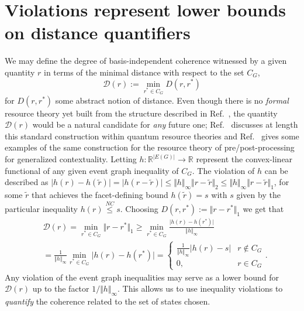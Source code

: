 \documentclass[a4paper,twocolumn,11pt,accepted=2024-01-17]{quantumarticle}
\begin{document}
\onecolumn
\appendix

\section{Violations represent lower bounds on distance quantifiers}\label{appendix: rigorous violations analysis}



We may define the degree of basis-independent coherence witnessed by a given quantity $r$ in terms of the minimal distance with respect to the set $C_G$,
\begin{equation}
    \mathcal{D}(r) := \min_{r^* \in C_G} D(r,r^*)
\end{equation}
for $D(r,r^*)$ some abstract notion of distance. Even though there is no \textit{formal} resource theory yet built from the structure described in Ref.~\cite{wagner2022inequalities}, the quantity $\mathcal{D}(r)$ would be a natural candidate for \textit{any} future one; Ref.~\cite[section VI, B]{Chitambar19} discusses at length this standard construction within quantum resource theories and Ref.~\cite{Duarte18} gives some examples of the same construction for the resource theory of pre/post-processing for generalized contextuality. Letting $h: \mathbb{R}^{|E(G)|} \to \mathbb{R}$ represent the convex-linear functional of any given event graph inequality of $C_G$. The violation of $h$ can be described as $\vert h(r) - h(\tilde{r})\vert = \vert h(r-\tilde{r})\vert \leq \Vert h\Vert_\infty \Vert r-\tilde{r} \Vert_2 \leq \Vert h\Vert_\infty \Vert r-\tilde{r} \Vert_1$, for some $\tilde{r}$ that achieves the facet-defining bound $h(\tilde{r}) = s$ with $s$ given by the particular inequality $h(r)\stackrel{NC}{\leq}s$. Choosing $D(r,r^*) := \Vert r-r^*\Vert_1$ we get that
\begin{align*}
    &\mathcal{D}(r) = \min_{r^* \in C_G} \Vert r-r^*\Vert_1 \geq \min_{r^* \in C_G}\frac{\vert h(r) - h(r^*)\vert }{\Vert h \Vert_\infty} \\
    &= \frac{1}{\Vert h \Vert_\infty}\min_{r^* \in C_G}\vert h(r) - h(r^*)\vert = \left\{\begin{matrix}\frac{1}{\Vert h \Vert_\infty}\vert h(r)-s\vert & r \notin C_G \\ 0, & r \in C_G\end{matrix}\right..
\end{align*}
Any violation of the event graph inequalities may serve as a lower bound for $\mathcal{D}(r)$ up to the factor $1/\Vert h \Vert_\infty$. This allows us to use inequality violations to \textit{quantify} the coherence related to the set of states chosen. 
\end{document}

